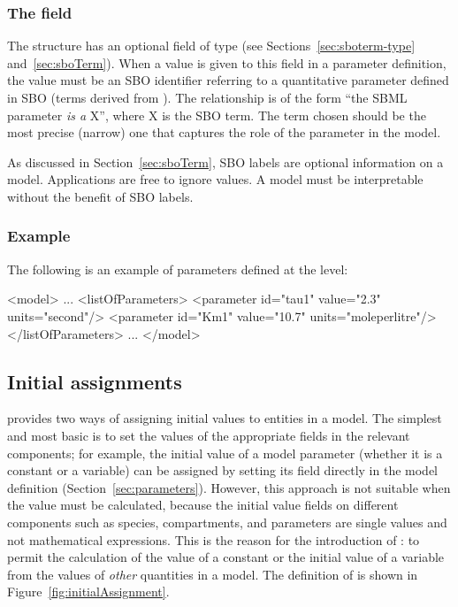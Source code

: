 \subsubsection{The  field}
\label{sec:parameter-sboterm}

The \Parameter structure has an optional  field of
type  (see Sections~\ref{sec:sboterm-type}
and~\ref{sec:sboTerm}).  When a value is given to this field in a
parameter definition, the value must be an SBO identifier
referring to a quantitative parameter defined in SBO (\ie terms
derived from \sboparameter).  The relationship is of the form
``the SBML parameter \emph{is a} X'', where X is the SBO term.
The term chosen should be the most precise (narrow) one that
captures the role of the parameter in the model.

As discussed in Section~\ref{sec:sboTerm}, SBO labels are optional
information on a model.  Applications are free to ignore
 values.  A model must be interpretable without the
benefit of SBO labels.


\subsubsection{Example}

The following is an example of parameters defined at the \Model level:

\begin{example}
<model>
    ...
    <listOfParameters>
        <parameter id="tau1" value="2.3" units="second"/>
        <parameter id="Km1" value="10.7" units="moleperlitre"/>
    </listOfParameters>
    ...
</model>
\end{example}



\subsection{Initial assignments}
\label{sec:initialAssignment}

\sbmltwotwo provides two ways of assigning initial values to
entities in a model.  The simplest and most basic is to set the
values of the appropriate  fields in the relevant
components; for example, the initial value of a model parameter
(whether it is a constant or a variable) can be assigned by
setting its  field directly in the model definition
(Section~\ref{sec:parameters}).  However, this approach is not
suitable when the value must be calculated, because the initial
value fields on different components such as species,
compartments, and parameters are single values and not
mathematical expressions.  This is the reason for the introduction
of \InitialAssignment: to permit the calculation of the value of a
constant or the initial value of a variable from the values of
\emph{other} quantities in a model.  The definition of
\InitialAssignment is shown in Figure~\ref{fig:initialAssignment}.

